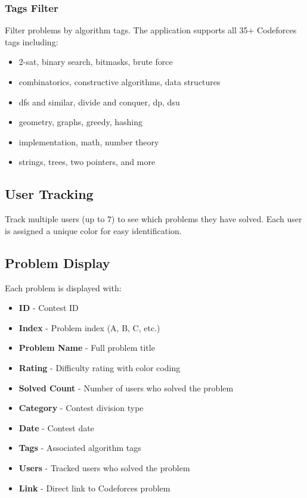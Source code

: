 \documentclass[12pt,a4paper]{article}
\begin{document}
\subsubsection{Tags Filter}
Filter problems by algorithm tags. The application supports all 35+ Codeforces tags including:
\begin{itemize}[leftmargin=*]
    \item 2-sat, binary search, bitmasks, brute force
    \item combinatorics, constructive algorithms, data structures
    \item dfs and similar, divide and conquer, dp, dsu
    \item geometry, graphs, greedy, hashing
    \item implementation, math, number theory
    \item strings, trees, two pointers, and more
\end{itemize}

\subsection{User Tracking}
Track multiple users (up to 7) to see which problems they have solved. Each user is assigned a unique color for easy identification.

\subsection{Problem Display}
Each problem is displayed with:
\begin{itemize}[leftmargin=*]
    \item \textbf{ID} - Contest ID
    \item \textbf{Index} - Problem index (A, B, C, etc.)
    \item \textbf{Problem Name} - Full problem title
    \item \textbf{Rating} - Difficulty rating with color coding
    \item \textbf{Solved Count} - Number of users who solved the problem
    \item \textbf{Category} - Contest division type
    \item \textbf{Date} - Contest date
    \item \textbf{Tags} - Associated algorithm tags
    \item \textbf{Users} - Tracked users who solved the problem
    \item \textbf{Link} - Direct link to Codeforces problem
\end{itemize}
\end{document}
